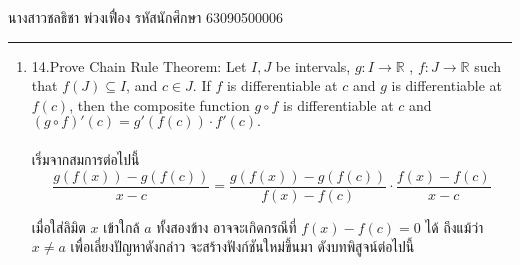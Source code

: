 \documentclass[12pt, a4paper]{article}
\begin{document}
\raggedleft นางสาวชลธิชา พ่วงเฟื่อง  รหัสนักศึกษา 63090500006 \\[12pt]
\hrule\vspace{12pt}
\raggedright

\begin{enumerate}
    \item 14.Prove Chain Rule Theorem: Let $I,J$ be intervals, $g : I\rightarrow \mathbb{R} $ ,  $f : J\rightarrow \mathbb{R} $ such that $f\left ( J \right )\subseteq I$, and $ c\in J.$
    If $f$ is differentiable at $c$ and $g$ is differentiable at $f\left ( c \right )$, then the composite function $g\circ f$
    is differentiable at $c $ and $ {\left (g\circ f  \right )}'\left ( c \right )={g}'\left ( f\left ( c \right ) \right )\cdot {f}'\left ( c \right ).$
    \\ \indent \\
    เริ่มจากสมการต่อไปนี้\\
    \hspace{1cm}$$\frac{g\left (f\left ( x \right )  \right )-g\left ( f\left ( c \right ) \right )}{x-c}=\frac{g\left (f\left ( x \right )  \right )-g\left ( f\left ( c \right ) \right )}{f\left (x  \right )-f\left (c  \right )}\cdot \frac{f\left (x  \right )-f\left (c  \right ) }{x-c}$$

    เมื่อใส่ลิมิต $x$ เข้าใกล้ $a$ ทั้งสองข้าง อาจจะเกิดกรณีที่ $f\left ( x \right )-f\left ( c \right )=0$ ได้ ถึงแม้ว่า $ x\neq a $ เพื่อเลี่ยงปัญหาดังกล่าว
    จะสร้างฟังก์ชันใหม่ขึ้นมา ดังบทพิสูจน์ต่อไปนี้ \\   



\end{enumerate}
\end{document}
